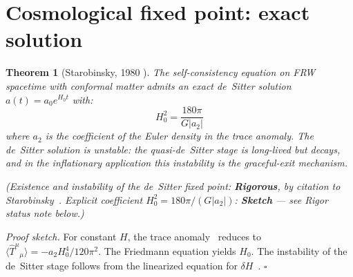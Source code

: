 \documentclass[12pt,a4paper]{article}
\newtheorem{theorem}{Theorem}
\begin{document}
\section{Cosmological fixed point: exact solution}
\label{sec:starobinsky}

\begin{theorem}[Starobinsky, 1980 \cite{starobinsky}]
The self-consistency equation on FRW spacetime with conformal matter admits an exact
de~Sitter solution $a(t) = a_0 e^{H_0 t}$ with:
\begin{equation}
H_0^2 = \frac{180\pi}{G|a_2|}
\end{equation}
where $a_2$ is the coefficient of the Euler density in the trace anomaly. The de~Sitter
solution is \emph{unstable}: the quasi-de~Sitter stage is long-lived but decays, and in
the inflationary application this instability is the graceful-exit mechanism.

\emph{(Existence and instability of the de~Sitter fixed point: \textbf{Rigorous}, by
citation to Starobinsky~\cite{starobinsky}. Explicit coefficient
$H_0^2 = 180\pi/(G|a_2|)$: \textbf{Sketch} --- see Rigor status note below.)}
\end{theorem}

\noindent\emph{Proof sketch.} For constant $H$, the trace anomaly~\cite{capper_duff}
reduces to $\langle\hat{T}^\mu{}_\mu\rangle = -a_2 H_0^4/120\pi^2$. The Friedmann
equation yields $H_0$. The instability of the de~Sitter stage follows from the linearized
equation for $\delta H$~\cite{starobinsky}. \hfill$\square$
\end{document}
